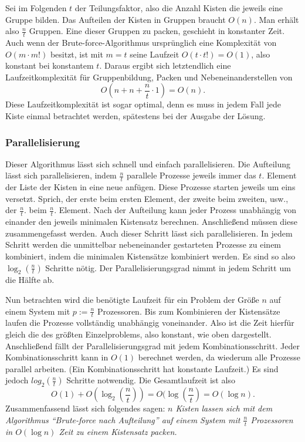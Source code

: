  Sei im Folgenden $t$ der Teilungsfaktor, also die Anzahl Kisten die jeweils eine Gruppe bilden.
 Das Aufteilen der Kisten in Gruppen braucht $O(n)$. Man erhält also $\frac{n}{t}$ Gruppen.
 Eine dieser Gruppen zu packen, geschieht in konstanter Zeit. Auch wenn der Brute-force-Algorithmus ursprünglich eine Komplexität von $O(m \cdot m!)$ besitzt,
 ist mit $m=t$ seine Laufzeit $O(t \cdot t!) = O(1)$, also konstant bei konstantem $t$.
 Daraus ergibt sich letztendlich eine Laufzeitkomplexität für Gruppenbildung, Packen und Nebeneinanderstellen von
  \[ O(n + n + \frac{n}{t} \cdot 1) = O(n). \]
 Diese Laufzeitkomplexität ist sogar optimal, denn es muss in jedem Fall jede Kiste einmal betrachtet werden, spätestens bei der Ausgabe der Lösung.
\subsubsection{Parallelisierung}
 Dieser Algorithmus lässt sich schnell und einfach parallelisieren.
 Die Aufteilung lässt sich parallelisieren, indem $\frac{n}{t}$ parallele Prozesse jeweils immer das $t.$ Element der Liste der Kisten in eine neue anfügen.
 Diese Prozesse starten jeweils um eins versetzt.
 Sprich, der erste beim ersten Element, der zweite beim zweiten, usw., der $\frac{n}{t}.$ beim $\frac{n}{t}.$ Element.
 Nach der Aufteilung kann jeder Prozess unabhängig von einander den jeweils minimalen Kistensatz berechnen.
 Anschließend müssen diese zusammengefasst werden. Auch dieser Schritt lässt sich parallelisieren.
 In jedem Schritt werden die unmittelbar nebeneinander gestarteten Prozesse zu einem kombiniert, indem die minimalen Kistensätze kombiniert werden.
 Es sind so also $\log_2(\frac{n}{t})$ Schritte nötig. Der Parallelisierungsgrad nimmt in jedem Schritt um die Hälfte ab.

 Nun betrachten wird die benötigte Laufzeit für ein Problem der Größe $n$ auf einem System mit $p := \frac{n}{t}$ Prozessoren.
 Bis zum Kombinieren der Kistensätze laufen die Prozesse vollständig unabhängig voneinander.
 Also ist die Zeit hierfür gleich die des größten Einzelproblems, also konstant, wie oben dargestellt.
 Anschließend fällt der Parallelisierungsgrad mit jedem Kombinationsschritt.
 Jeder Kombinationsschritt kann in $O(1)$ berechnet werden, da wiederum alle Prozesse parallel arbeiten.
 (Ein Kombinationsschritt hat konstante Laufzeit.)
 Es sind jedoch $log_2(\frac{n}{t})$ Schritte notwendig.
 Die Gesamtlaufzeit ist also \[O(1)+O(\log_2(\frac{n}{t}))=O(\log(\frac{n}{t})=O(\log n).\]
 Zusammenfassend lässt sich folgendes sagen:
 \emph{$n$ Kisten lassen sich mit dem Algorithmus ``Brute-force nach Aufteilung'' auf einem System mit $\frac{n}{t}$ Prozessoren in $O(\log n)$ Zeit zu einem Kistensatz packen.}

